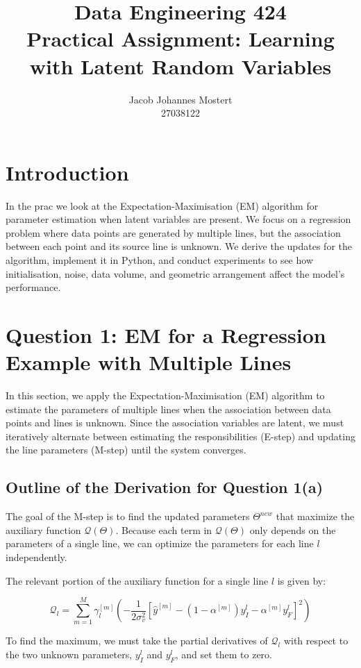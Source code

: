 \documentclass{article}
\title{
    \vspace{-2cm}
    \Large Data Engineering 424 \\
    \Large Practical Assignment: Learning with Latent Random Variables\\
}
\author{
    Jacob Johannes Mostert \\ 
    27038122
}
\begin{document}
\maketitle

\section{Introduction}
In the prac we look at the Expectation-Maximisation (EM) algorithm for parameter estimation when latent variables are present. We focus on a regression problem where data points are generated by multiple lines, but the association between each point and its source line is unknown. We derive the updates for the algorithm, implement it in Python, and conduct experiments to see how initialisation, noise, data volume, and geometric arrangement affect the model's performance.

\section{Question 1: EM for a Regression Example with Multiple Lines}

In this section, we apply the Expectation-Maximisation (EM) algorithm to estimate the parameters of multiple lines when the association between data points and lines is unknown. Since the association variables are latent, we must iteratively alternate between estimating the responsibilities (E-step) and updating the line parameters (M-step) until the system converges.

\subsection{Outline of the Derivation for Question 1(a)}

The goal of the M-step is to find the updated parameters $\Theta^{new}$ that maximize the auxiliary function $\mathcal{Q}(\Theta)$. Because each term in $\mathcal{Q}(\Theta)$ only depends on the parameters of a single line, we can optimize the parameters for each line $l$ independently.

The relevant portion of the auxiliary function for a single line $l$ is given by:

$$
\mathcal{Q}_l = \sum_{m=1}^{M} \gamma_l^{[m]} \left( -\frac{1}{2\sigma_v^2} \left[ \hat{y}^{[m]} - (1-\alpha^{[m]})y_I^l - \alpha^{[m]}y_F^l \right]^2 \right)
$$

To find the maximum, we must take the partial derivatives of $\mathcal{Q}_l$ with respect to the two unknown parameters, $y_I^l$ and $y_F^l$, and set them to zero. 
\end{document}
